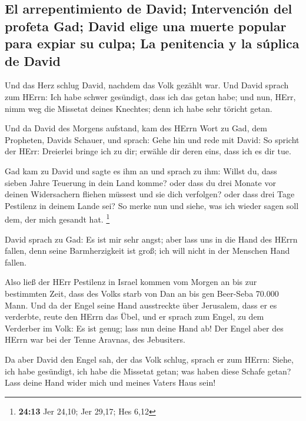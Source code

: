 \hypertarget{el-arrepentimiento-de-david-intervenciuxf3n-del-profeta-gad-david-elige-una-muerte-popular-para-expiar-su-culpa-la-penitencia-y-la-suxfaplica-de-david}{%
\subsection{El arrepentimiento de David; Intervención del profeta Gad;
David elige una muerte popular para expiar su culpa; La penitencia y la
súplica de
David}\label{el-arrepentimiento-de-david-intervenciuxf3n-del-profeta-gad-david-elige-una-muerte-popular-para-expiar-su-culpa-la-penitencia-y-la-suxfaplica-de-david}}

 Und das Herz schlug David, nachdem das Volk gezählt war.
Und David sprach zum HErrn: Ich habe schwer gesündigt, dass ich das
getan habe; und nun, HErr, nimm weg die Missetat deines Knechtes; denn
ich habe sehr töricht getan.

 Und da David des Morgens aufstand, kam des HErrn Wort zu
Gad, dem Propheten, Davids Schauer, und sprach:  Gehe hin
und rede mit David: So spricht der HErr: Dreierlei bringe ich zu dir;
erwähle dir deren eins, dass ich es dir tue.

 Gad kam zu David und sagte es ihm an und sprach zu ihm:
Willst du, dass sieben Jahre Teuerung in dein Land komme? oder dass du
drei Monate vor deinen Widersachern fliehen müssest und sie dich
verfolgen? oder dass drei Tage Pestilenz in deinem Lande sei? So merke
nun und siehe, was ich wieder sagen soll dem, der mich gesandt hat.
\footnote{\textbf{24:13} Jer 24,10; Jer 29,17; Hes 6,12}

 David sprach zu Gad: Es ist mir sehr angst; aber lass
uns in die Hand des HErrn fallen, denn seine Barmherzigkeit ist groß;
ich will nicht in der Menschen Hand fallen.

 Also ließ der HErr Pestilenz in Israel kommen vom Morgen
an bis zur bestimmten Zeit, dass des Volks starb von Dan an bis gen
Beer-Seba 70.000 Mann.  Und da der Engel seine Hand
ausstreckte über Jerusalem, dass er es verderbte, reute den HErrn das
Übel, und er sprach zum Engel, zu dem Verderber im Volk: Es ist genug;
lass nun deine Hand ab! Der Engel aber des HErrn war bei der Tenne
Aravnas, des Jebusiters.

 Da aber David den Engel sah, der das Volk schlug, sprach
er zum HErrn: Siehe, ich habe gesündigt, ich habe die Missetat getan;
was haben diese Schafe getan? Lass deine Hand wider mich und meines
Vaters Haus sein!

